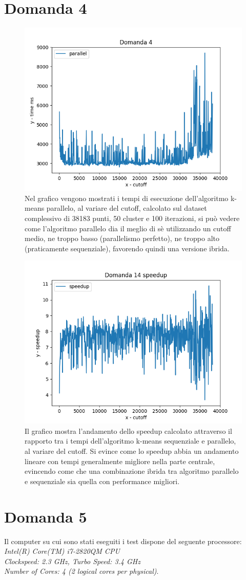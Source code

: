 \documentclass{article}
\begin{document}
\vspace{-3cm}
\section*{Domanda 4}
\begin{center}
	\begin{figure}[H]
		\hspace*{1.5cm}\includegraphics[width=0.7\linewidth, valign=t]{figures/domanda4}
		\caption*{Nel grafico vengono mostrati i tempi di esecuzione dell'algoritmo k-means parallelo, al variare del cutoff, calcolato sul dataset complessivo di 38183 punti, 50 cluster e 100 iterazioni, si può vedere come l'algoritmo parallelo dia il meglio di sè utilizzando un cutoff medio, ne troppo basso (parallelismo perfetto), ne troppo alto (praticamente sequenziale), favorendo quindi una versione ibrida.}
	\end{figure}
\end{center}

\begin{center}
	\begin{figure}[H]
		\hspace*{1.5cm}\includegraphics[width=0.7\linewidth, valign=t]{figures/domanda4speedup}
		\caption*{Il grafico mostra l'andamento dello speedup calcolato attraverso il rapporto tra i tempi dell'algoritmo k-means sequenziale e parallelo, al variare del cutoff. Si evince come lo speedup abbia un andamento lineare con tempi generalmente migliore nella parte centrale, evincendo come che una combinazione ibrida tra algoritmo parallelo e sequenziale sia quella con performance migliori.}
	\end{figure}
\end{center}

\section*{Domanda 5}
Il computer su cui sono stati eseguiti i test dispone del seguente processore: \textit{Intel(R) Core(TM) i7-2820QM CPU\\ Clockspeed: 2.3 GHz, Turbo Speed: 3.4 GHz\\ Number of Cores: 4 (2 logical cores per physical)}.
\end{document}
